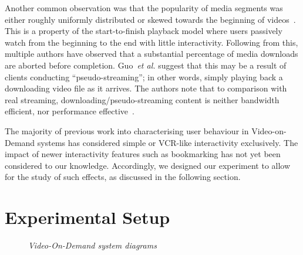 \documentclass[a4paper,11pt]{article}
\newcommand{\capttext}{\protect\centering\em}
\begin{document}
Another common observation was that the popularity of media segments was either roughly uniformly distributed or skewed towards the beginning of videos~\cite{Costa04Analyzing,Almeida01Analysis}. This is a property of the start-to-finish playback model where users passively watch from the beginning to the end with little interactivity. Following from this, multiple authors have observed that a substantial percentage of media downloads are aborted before completion. Guo~\emph{et al.} suggest that this may be a result of clients conducting ``pseudo-streaming''; in other words, simply playing back a downloading video file as it arrives. The authors note that to comparison with real streaming, downloading/pseudo-streaming content is neither bandwidth efficient, nor performance effective~\cite{Guo05Analysis,Acharya00Characterizing}.

The majority of previous work into characterising user behaviour in Video-on-Demand systems has considered simple or VCR-like interactivity exclusively. The impact of newer interactivity features such as bookmarking has not yet been considered to our knowledge. Accordingly, we designed our experiment to allow for the study of such effects, as discussed in the following section.

\section{Experimental Setup}
\label{sect:methodology}

\begin{figure}[tbp]
    \centering


    \caption{\capttext Video-On-Demand system diagrams}
    \label{fig:system}
\end{figure}
\end{document}
